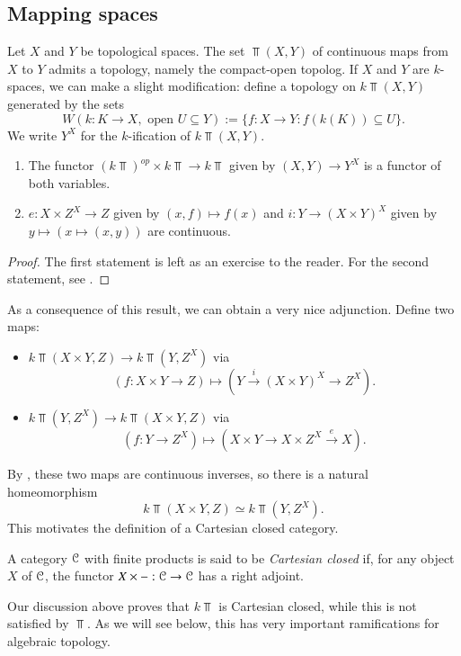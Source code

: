 \subsection{Mapping spaces}\label{mappingspaces}
Let $X$ and $Y$ be topological spaces.
The set $\Top(X,Y)$ of continuous maps from $X$ to $Y$ admits a topology, namely the compact-open topolog.
If $X$ and $Y$ are $k$-spaces, we can make a slight modification:
define a topology on $k\Top(X,Y)$ generated by the sets
$$W(k:K\to X, \text{ open }U\subseteq Y) := \{f:X\to Y: f(k(K))\subseteq U\}.$$
We write $Y^X$ for the $k$-ification of $k\Top(X,Y)$.
\begin{prop}
    \begin{enumerate}
	\item The functor $(k\Top)^{op}\times k\Top\to k\Top$ given by $(X,Y)\to Y^X$ is a functor of both variables.
	\item $e:X\times Z^X\to Z$ given by $(x,f)\mapsto f(x)$ and $i:Y\to (X\times Y)^X$ given by $y\mapsto(x\mapsto(x,y))$ are continuous.
    \end{enumerate}
\end{prop}
\begin{proof}
    The first statement is left as an exercise to the reader.
    For the second statement, see \cite[Proposition 2.11]{StricklandCGWH}.
\end{proof}
As a consequence of this result, we can obtain a very nice adjunction.
Define two maps:
\begin{itemize}
    \item $k\Top(X\times Y,Z)\to k\Top(Y,Z^X)$ via
	$$(f:X\times Y\to Z)\mapsto (Y\xrightarrow{i}(X\times Y)^X\to Z^X).$$
    \item $k\Top(Y,Z^X) \to k\Top(X\times Y,Z)$ via
	$$(f:Y\to Z^X)\mapsto(X\times Y\to X\times Z^X\xrightarrow{e} X).$$
\end{itemize}
By \cite[Proposition 2.12]{StricklandCGWH}, these two maps are continuous inverses, so there is a natural homeomorphism
$$k\Top(X\times Y,Z)\simeq k\Top(Y,Z^X).$$
This motivates the definition of a {Cartesian closed} category.
\begin{definition}
    A category $\mathcal C$ with finite products is said to be
    \emph{Cartesian closed} if, for any object $X$ of $\mathcal C$, the functor $X\times -:\mathcal C\to \mathcal C$ has a right adjoint.
\end{definition}
Our discussion above proves that $k\Top$ is Cartesian closed, while this is not satisfied by $\Top$.
As we will see below, this has very important ramifications for algebraic topology.
\begin{exercise}
\end{exercise}
